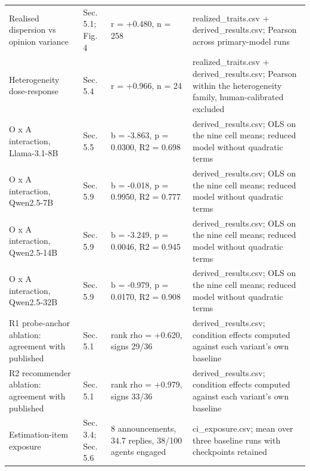 \begin{table}[t]
\begin{tabular}{@{}p{4.0cm}p{2.0cm}p{3.1cm}p{4.2cm}@{}}
Realised dispersion vs opinion variance & Sec. 5.1; Fig. 4 & r = +0.480, n = 258 & realized\_traits.csv + derived\_results.csv; Pearson across primary-model runs \\[2pt]
Heterogeneity dose-response & Sec. 5.4 & r = +0.966, n = 24 & realized\_traits.csv + derived\_results.csv; Pearson within the heterogeneity family, human-calibrated excluded \\[2pt]
O x A interaction, Llama-3.1-8B & Sec. 5.5 & b = -3.863, p = 0.0300, R2 = 0.698 & derived\_results.csv; OLS on the nine cell means; reduced model without quadratic terms \\[2pt]
O x A interaction, Qwen2.5-7B & Sec. 5.9 & b = -0.018, p = 0.9950, R2 = 0.777 & derived\_results.csv; OLS on the nine cell means; reduced model without quadratic terms \\[2pt]
O x A interaction, Qwen2.5-14B & Sec. 5.9 & b = -3.249, p = 0.0046, R2 = 0.945 & derived\_results.csv; OLS on the nine cell means; reduced model without quadratic terms \\[2pt]
O x A interaction, Qwen2.5-32B & Sec. 5.9 & b = -0.979, p = 0.0170, R2 = 0.908 & derived\_results.csv; OLS on the nine cell means; reduced model without quadratic terms \\[2pt]
R1 probe-anchor ablation: agreement with published & Sec. 5.1 & rank rho = +0.620, signs 29/36 & derived\_results.csv; condition effects computed against each variant's own baseline \\[2pt]
R2 recommender ablation: agreement with published & Sec. 5.1 & rank rho = +0.979, signs 33/36 & derived\_results.csv; condition effects computed against each variant's own baseline \\[2pt]
Estimation-item exposure & Sec. 3.4; Sec. 5.6 & 8 announcements, 34.7 replies, 38/100 agents engaged & ci\_exposure.csv; mean over three baseline runs with checkpoints retained \\[2pt]
\bottomrule
\end{tabular}
\end{table}
